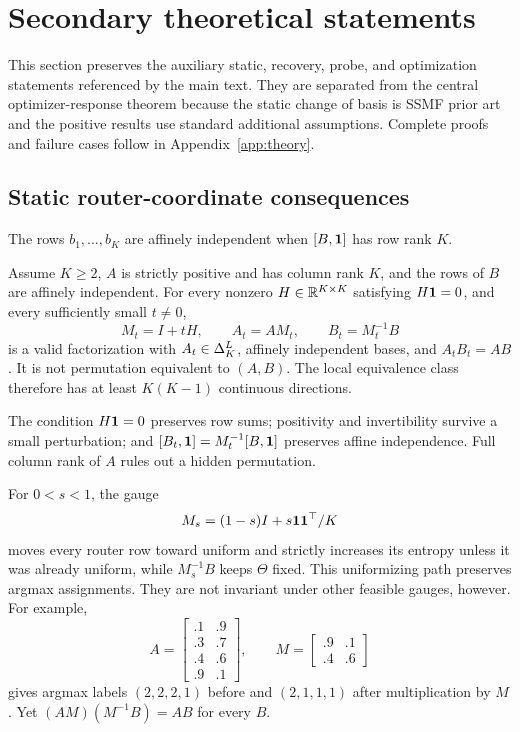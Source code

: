 \section{Secondary theoretical statements}
\label{app:secondary-theory-statements}

This section preserves the auxiliary static, recovery, probe, and optimization
statements referenced by the main text.  They are separated from the central
optimizer-response theorem because the static change of basis is SSMF prior
art and the positive results use standard additional assumptions.  Complete
proofs and failure cases follow in Appendix~\ref{app:theory}.

\subsection{Static router-coordinate consequences}

The rows $b_1,\ldots,b_K$ are affinely independent when
$[B,\mathbf{1}]$ has row rank $K$.

\begin{proposition}
\label{thm:continuous_gauge}
Assume $K\ge2$, $A$ is strictly positive and has column rank $K$, and the
rows of $B$ are affinely independent.  For every nonzero
$H\in\mathbb{R}^{K\times K}$ satisfying $H\mathbf{1}=0$, and every sufficiently small
$t\ne0$,
\begin{equation}
 M_t=I+tH,\qquad A_t=AM_t,\qquad B_t=M_t^{-1}B
 \label{eq:gauge_path}
\end{equation}
is a valid factorization with $A_t\in\Delta_K^L$, affinely independent
bases, and $A_tB_t=AB$.  It is not permutation equivalent to $(A,B)$.  The
local equivalence class therefore has at least $K(K-1)$ continuous
directions.
\end{proposition}

The condition $H\mathbf{1}=0$ preserves row sums; positivity and invertibility
survive a small perturbation; and
$[B_t,\mathbf{1}]=M_t^{-1}[B,\mathbf{1}]$ preserves affine independence.  Full column
rank of $A$ rules out a hidden permutation.

For $0<s<1$, the gauge
\begin{equation}
 M_s=(1-s)I+s\mathbf{1}\mathbf{1}^\top/K
 \label{eq:uniformizing_gauge}
\end{equation}
moves every router row toward uniform and strictly increases its entropy
unless it was already uniform, while $M_s^{-1}B$ keeps $\Theta$ fixed.
This uniformizing path preserves argmax assignments. They are not
invariant under other feasible gauges, however. For example,
\begin{equation}
 A=\begin{bmatrix}.1&.9\\.3&.7\\.4&.6\\.9&.1\end{bmatrix},\qquad
 M=\begin{bmatrix}.9&.1\\.4&.6\end{bmatrix}
 \label{eq:argmax_example}
\end{equation}
gives argmax labels $(2,2,2,1)$ before and $(2,1,1,1)$ after multiplication
by $M$.  Yet $(AM)(M^{-1}B)=AB$ for every $B$.

